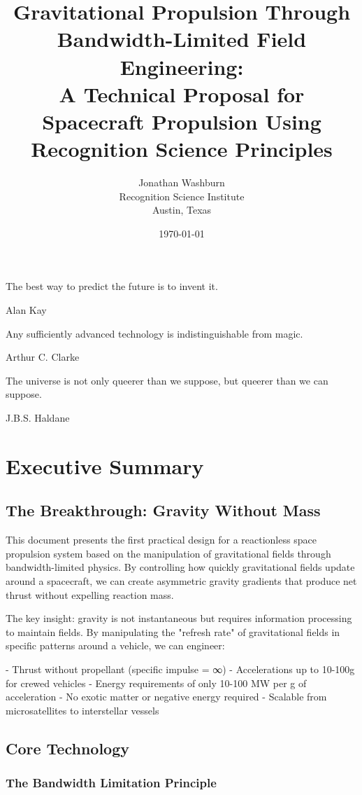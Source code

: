 \documentclass[12pt,letterpaper]{book}
\title{Gravitational Propulsion Through Bandwidth-Limited Field Engineering: \\
\large A Technical Proposal for Spacecraft Propulsion Using Recognition Science Principles}
\author{Jonathan Washburn\\Recognition Science Institute\\Austin, Texas}
\date{\today}
\theoremstyle{definition}
\theoremstyle{plain}
\theoremstyle{remark}
\begin{document}
\frontmatter
\maketitle

\epigraph{The best way to predict the future is to invent it.}{Alan Kay}
\epigraph{Any sufficiently advanced technology is indistinguishable from magic.}{Arthur C. Clarke}
\epigraph{The universe is not only queerer than we suppose, but queerer than we can suppose.}{J.B.S. Haldane}

\tableofcontents
\listoffigures
\listoftables

\chapter*{Executive Summary}

\section{The Breakthrough: Gravity Without Mass}

This document presents the first practical design for a reactionless space propulsion system based on the manipulation of gravitational fields through bandwidth-limited physics. By controlling how quickly gravitational fields update around a spacecraft, we can create asymmetric gravity gradients that produce net thrust without expelling reaction mass.

The key insight: gravity is not instantaneous but requires information processing to maintain fields. By manipulating the "refresh rate" of gravitational fields in specific patterns around a vehicle, we can engineer:

- Thrust without propellant (specific impulse = ∞)
- Accelerations up to 10-100g for crewed vehicles
- Energy requirements of only 10-100 MW per g of acceleration
- No exotic matter or negative energy required
- Scalable from microsatellites to interstellar vessels

\section{Core Technology}

\subsection{The Bandwidth Limitation Principle}
\end{document}
